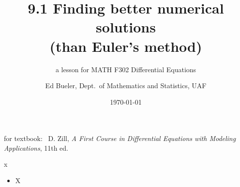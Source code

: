 \documentclass[urlcolor=blue,dvipsnames]{beamer}
\title{9.1 Finding better numerical solutions \\ (than Euler's method)}
\subtitle{a lesson for MATH F302 Differential Equations}
\author{Ed Bueler, Dept.~of Mathematics and Statistics, UAF}
\date{\tiny \today}
\begin{document}
\renewcommand{\thefootnote}{{\color{green} \arabic{footnote}}}

\begin{frame}
\titlepage

\centerline{\tiny for textbook: \, D. Zill, \emph{A First Course in Differential Equations with Modeling Applications}, 11th ed.}
\end{frame}


\begin{frame}{x}

\begin{itemize}
\item X
\end{itemize}
\end{frame}
\end{document}
